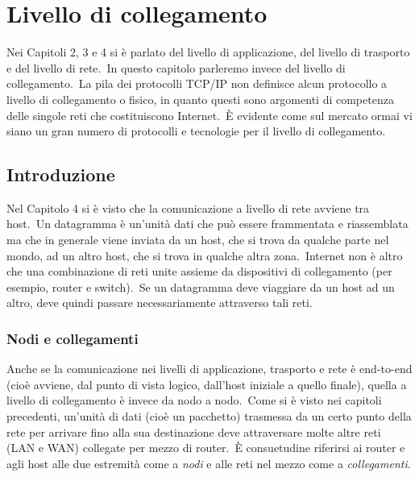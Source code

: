 \chapter{Livello di collegamento}

Nei Capitoli 2, 3 e 4 si è parlato del livello di applicazione, del livello di trasporto e del livello di rete.\
In questo capitolo parleremo invece del livello di collegamento.\
La pila dei protocolli TCP/IP non definisce alcun protocollo a livello di collegamento o fisico, in quanto questi sono argomenti di competenza delle singole reti che costituiscono Internet.\
È evidente come sul mercato ormai vi siano un gran numero di protocolli e tecnologie per il livello di collegamento.

\section{Introduzione}

Nel Capitolo 4 si è visto che la comunicazione a livello di rete avviene tra host.\
Un datagramma è un'unità dati che può essere frammentata e riassemblata ma che in generale viene inviata da un host, che si trova da qualche parte nel mondo, ad un altro host, che si trova in qualche altra zona.\
Internet non è altro che una combinazione di reti unite assieme da dispositivi di collegamento (per esempio, router e switch).\
Se un datagramma deve viaggiare da un host ad un altro, deve quindi passare necessariamente attraverso tali reti.

\subsection{Nodi e collegamenti}

Anche se la comunicazione nei livelli di applicazione, trasporto e rete è end-to-end (cioè avviene, dal punto di vista logico, dall'host iniziale a quello finale), quella a livello di collegamento è invece da nodo a nodo.\
Come si è visto nei capitoli precedenti, un'unità di dati (cioè un pacchetto) trasmessa da un certo punto della rete per arrivare fino alla sua destinazione deve attraversare molte altre reti (LAN e WAN) collegate per mezzo di router.\
È consuetudine riferirsi ai router e agli host alle due estremità come a \emph{nodi} e alle reti nel mezzo come a \emph{collegamenti}.

